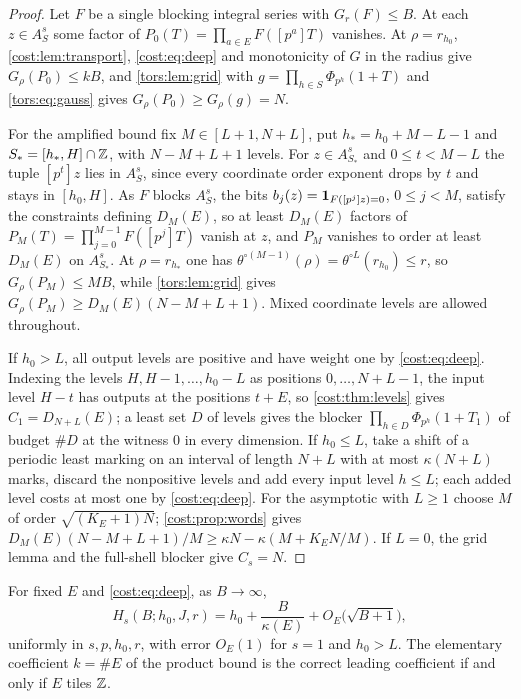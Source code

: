 \begin{proof}
Let $F$ be a single blocking integral series with $G_r(F)\le B$. At each $z\in A_S^s$ some
factor of $P_0(T)=\prod_{a\in E}F([p^a]T)$ vanishes. At $\rho=r_{h_0}$,
\cref{cost:lem:transport}, \eqref{cost:eq:deep} and monotonicity of $G$ in the radius give
$G_\rho(P_0)\le kB$, and \cref{tors:lem:grid} with $g=\prod_{h\in S}\Phi_{p^h}(1+T)$ and
\eqref{tors:eq:gauss} gives $G_\rho(P_0)\ge G_\rho(g)=N$.

For the amplified bound fix $M\in[L+1,N+L]$, put $h_*=h_0+M-L-1$ and $S_*=[h_*,H]\cap\mathbb{Z}$,
with $N-M+L+1$ levels. For $z\in A_{S_*}^s$ and $0\le t<M-L$ the tuple $[p^t]z$ lies in
$A_S^s$, since every coordinate order exponent drops by $t$ and stays in $[h_0,H]$. As $F$
blocks $A_S^s$, the bits $b_j(z)=\mathbf{1}_{F([p^j]z)=0}$, $0\le j<M$, satisfy the constraints
defining $D_M(E)$, so at least $D_M(E)$ factors of $P_M(T)=\prod_{j=0}^{M-1}F([p^j]T)$ vanish
at $z$, and $P_M$ vanishes to order at least $D_M(E)$ on $A_{S_*}^s$. At $\rho=r_{h_*}$ one
has $\theta^{\circ(M-1)}(\rho)=\theta^{\circ L}(r_{h_0})\le r$, so $G_\rho(P_M)\le MB$, while
\cref{tors:lem:grid} gives $G_\rho(P_M)\ge D_M(E)(N-M+L+1)$. Mixed coordinate levels are
allowed throughout.

If $h_0>L$, all output levels are positive and have weight one by \eqref{cost:eq:deep}.
Indexing the levels $H,H-1,\dots,h_0-L$ as positions $0,\dots,N+L-1$, the input level $H-t$
has outputs at the positions $t+E$, so \cref{cost:thm:levels} gives $C_1=D_{N+L}(E)$; a
least set $D$ of levels gives the blocker $\prod_{h\in D}\Phi_{p^h}(1+T_1)$ of budget $\#D$
at the witness $0$ in every dimension. If $h_0\le L$, take a shift of a periodic least
marking on an interval of length $N+L$ with at most $\kappa(N+L)$ marks, discard the
nonpositive levels and add every input level $h\le L$; each added level costs at most one by
\eqref{cost:eq:deep}. For the asymptotic with $L\ge1$ choose $M$ of order $\sqrt{(K_E+1)N}$;
\cref{cost:prop:words} gives
$D_M(E)(N-M+L+1)/M\ge\kappa N-\kappa(M+K_EN/M)$. If $L=0$, the grid lemma and the full-shell
blocker give $C_s=N$.
\end{proof}

\begin{corollary}\label{cost:cor:chainendpoint}
For fixed $E$ and \eqref{cost:eq:deep}, as $B\to\infty$,
\[
 H_s(B;h_0,J,r)=h_0+\frac B{\kappa(E)}+O_E\bigl(\sqrt{B+1}\bigr),
\]
uniformly in $s,p,h_0,r$, with error $O_E(1)$ for $s=1$ and $h_0>L$. The elementary
coefficient $k=\#E$ of the product bound is the correct leading coefficient if and only if
$E$ tiles $\mathbb{Z}$.
\end{corollary}

